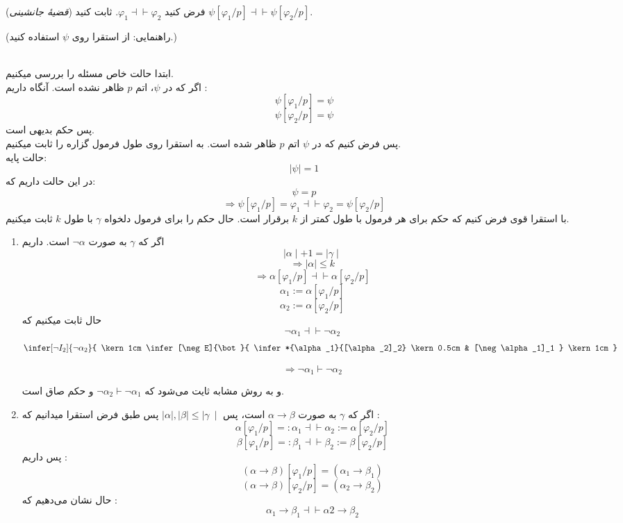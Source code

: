 
	
	(\emph{قضیهٔ جانشینی})
	فرض کنید
	$\varphi_1\dashv\vdash\varphi_2$.
	ثابت کنید
	$\psi[\varphi_1/p]\dashv\vdash\psi[\varphi_2/p]$.
	
	(راهنمایی: از استقرا روی $\psi$ استفاده کنید.)
	\begin{ans}
	\\	ابتدا حالت خاص مسئله را بررسی میکنیم. \\ اگر که در $\psi$، اتم ${p}$ ظاهر نشده است. آنگاه  داریم : \\
	$$
		\psi[\varphi_1/p] = \psi
	$$
	$$
		\psi[\varphi_2/p] = \psi
	$$
	پس حکم بدیهی است.\\
	پس فرض کنیم که در $\psi$ اتم $p$ ظاهر شده است. به استقرا روی طول فرمول گزاره را ثابت میکنیم. \\
	حالت پایه:
	$$ \mid \psi \mid = 1 $$
	 در این حالت داریم که‌:
	 $$ \psi = p $$
	$$\Longrightarrow {\psi[\varphi_1/p] = \varphi_1 \dashv\vdash \varphi_2 = \psi[\varphi_2/p]}$$
	با استقرا قوی فرض کنیم که حکم برای هر فرمول با طول کمتر از $k$ برقرار است. حال حکم را برای فرمول‌ دلخواه $\gamma$ با طول $k$ ثابت میکنیم.
	\quad\vspace{0.5 cm}
	\begin{enumerate}
		\item اگر که $\gamma$ به صورت $\neg \alpha$ است. داریم
		$$\mid \alpha \mid + 1 = \mid \gamma \mid$$
		$$\Longrightarrow {\mid \alpha \mid \le k}$$
		$$\Longrightarrow {\alpha[\varphi_1/p] \dashv\vdash \alpha[\varphi_2/p]}$$
		$$
			\alpha_1 := \alpha[\varphi_1/p]
		$$
		$$
			\alpha_2 := \alpha[\varphi_2/p]
		$$
		حال ثابت میکنیم که
		$$ \neg \alpha_1 \dashv\vdash \neg \alpha_2$$  
		$$
			\infer[\neg I_2]{\neg \alpha_2}{
				\kern 1cm \infer[\neg E]{\bot}{
					\infer*{\alpha_1}{[\alpha_2]_2} \kern 0.5cm
					& 
					[\neg \alpha_1]_1
				} \kern 1cm
			}
		$$
	
		$$
			\Longrightarrow {\neg \alpha_1 \vdash \neg \alpha_2}	
		$$
	
	و به روش مشابه ثایت می‌شود که
		$ \neg \alpha_2 \vdash \neg \alpha_1$
	و حکم صاق است.
	\item   
		اگر که $\gamma$ به صورت
		$\alpha \rightarrow \beta$
		است، پس 
		$\mid \alpha \mid , \mid \beta \mid \le \mid \gamma\ \mid$
		پس طبق فرض استقرا میدانیم که :
		$$ 
		\alpha[\varphi_1/p] =: \alpha_1 \dashv\vdash \alpha_2 := \alpha[\varphi_2/p]
		$$
		$$
		\beta[\varphi_1/p] =: \beta_1 \dashv\vdash \beta_2 := 			\beta[\varphi_2/p]
		$$
			پس داریم :
		$$
		 	(\alpha \rightarrow \beta) [\varphi_1/p] = (\alpha_1 \rightarrow \beta_1)
		$$
		$$
			(\alpha \rightarrow \beta) [\varphi_2/p] = (\alpha_2 \rightarrow \beta_2)
		$$
		حال نشان می‌دهیم که :
		$$
			\alpha_1 \rightarrow \beta_1 \dashv\vdash \alpha2 \rightarrow \beta_2	
		$$
		

\end{enumerate}
\end{ans}
